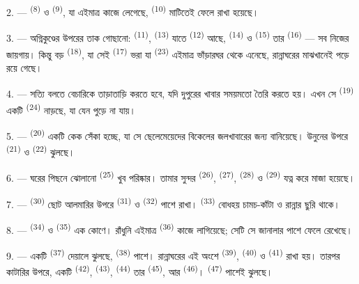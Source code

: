 2. ---  \textsuperscript{(8)} ও 
\textsuperscript{(9)}, যা এইমাত্র কাজে লেগেছে, 
\textsuperscript{(10)} মাটিতেই ফেলে রাখা হয়েছে।

3. --- অগ্নিকুণ্ডের উপরের তাক গোছানো:  \textsuperscript{(11)},
 \textsuperscript{(13)} যাতে 
\textsuperscript{(12)} আছে,  \textsuperscript{(14)} ও
 \textsuperscript{(15)} তার 
\textsuperscript{(16)} --- সব নিজের জায়গায়। কিন্তু বড় 
\textsuperscript{(18)}, যা সেই  \textsuperscript{(17)} ভরা যা
 \textsuperscript{(23)} এইমাত্র ভাঁড়ারঘর থেকে এনেছে,
রান্নাঘরের মাঝখানেই পড়ে রয়ে গেছে।

4. --- সত্যি বলতে বেচারিকে তাড়াতাড়ি করতে হবে, যদি দুপুরের খাবার সময়মতো
তৈরি করতে হয়। এখন সে  \textsuperscript{(19)} একটি
 \textsuperscript{(24)} নাড়ছে, যা যেন পুড়ে না যায়।

5. ---  \textsuperscript{(20)} একটি কেক সেঁকা হচ্ছে, যা সে
ছেলেমেয়েদের বিকেলের জলখাবারের জন্য বানিয়েছে। উনুনের উপরে 
\textsuperscript{(21)} ও  \textsuperscript{(22)} ঝুলছে।

\VUsaut{4.0mm}
\VUsaut{3.0mm}

6. --- ঘরের পিছনে ঝোলানো  \textsuperscript{(25)} খুব
পরিষ্কার। তামার সুন্দর  \textsuperscript{(26)}, 
\textsuperscript{(27)},  \textsuperscript{(28)} ও 
\textsuperscript{(29)} যত্ন করে মাজা হয়েছে।

7. ---  \textsuperscript{(30)} ছোট আলমারির উপরে  \textsuperscript{(31)} ও  \textsuperscript{(32)}
পাশে রাখা।  \textsuperscript{(33)} বোধহয় চামচ-কাঁটা ও রান্নার
ছুরি থাকে।

8. ---  \textsuperscript{(34)} ও 
\textsuperscript{(35)} এক কোণে। রাঁধুনি এইমাত্র 
\textsuperscript{(36)} কাজে লাগিয়েছে; সেটি সে জানালার পাশে ফেলে রেখেছে।

9. --- একটি  \textsuperscript{(37)} দেয়ালে ঝুলছে,
 \textsuperscript{(38)} পাশে। রান্নাঘরের এই অংশে  \textsuperscript{(39)},  \textsuperscript{(40)} ও
 \textsuperscript{(41)} রাখা হয়। তারপর কাটারির উপরে, একটি
 \textsuperscript{(42)},  \textsuperscript{(43)},
 \textsuperscript{(44)} তার 
\textsuperscript{(45)}, আর  \textsuperscript{(46)}।
 \textsuperscript{(47)} পাশেই ঝুলছে।

